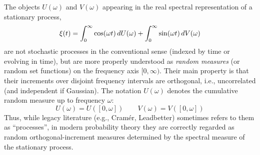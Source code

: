 \documentclass{article}
\newcommand{\tmem}[1]{{\em #1\/}}
\begin{document}
\begin{remark}
  The objects $U (\omega)$ and $V (\omega)$ appearing in the real spectral
  representation of a stationary process,
  \begin{equation}
    \xi (t) = \int_0^{\infty} \cos (\omega t)  \hspace{0.17em} dU (\omega) +
    \int_0^{\infty} \sin (\omega t)  \hspace{0.17em} dV (\omega)
  \end{equation}
  are not stochastic processes in the conventional sense (indexed by time or
  evolving in time), but are more properly understood as {\tmem{random
  measures}} (or random set functions) on the frequency axis $[0, \infty)$.
  Their main property is that their increments over disjoint frequency
  intervals are orthogonal, i.e., uncorrelated (and independent if Gaussian).
  The notation $U (\omega)$ denotes the cumulative random measure up to
  frequency $\omega$:
  \begin{equation}
    U (\omega) = U ([0, \omega]) \qquad V (\omega) = V ([0, \omega])
  \end{equation}
  Thus, while legacy literature (e.g., Cram{\'e}r, Leadbetter) sometimes
  refers to them as ``processes'', in modern probability theory they are
  correctly regarded as random orthogonal-increment measures determined by the
  spectral measure of the stationary process.
\end{remark}
\end{document}
